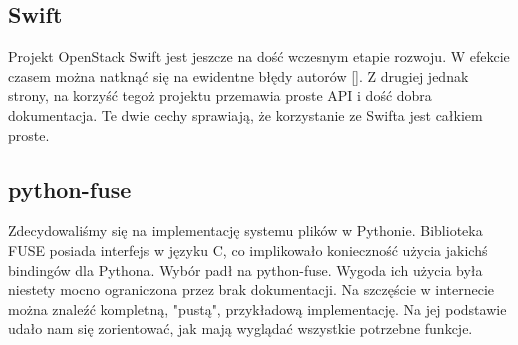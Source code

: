 \subsection{Swift}

Projekt OpenStack Swift jest jeszcze na dość wczesnym etapie rozwoju. W
efekcie czasem można natknąć się na ewidentne błędy autorów []. Z drugiej jednak strony, na korzyść tegoż projektu przemawia proste
API i dość dobra dokumentacja. Te dwie cechy sprawiają, że korzystanie ze
Swifta jest całkiem proste.

\subsection{python-fuse}

Zdecydowaliśmy się na implementację systemu plików w Pythonie. Biblioteka FUSE
posiada interfejs w języku C, co implikowało konieczność użycia jakichś
bindingów dla Pythona. Wybór padł na python-fuse. Wygoda ich użycia była
niestety mocno ograniczona przez brak dokumentacji. Na szczęście w internecie
można znaleźć kompletną, "pustą", przykładową implementację. Na jej podstawie
udało nam się zorientować, jak mają wyglądać wszystkie potrzebne funkcje.

